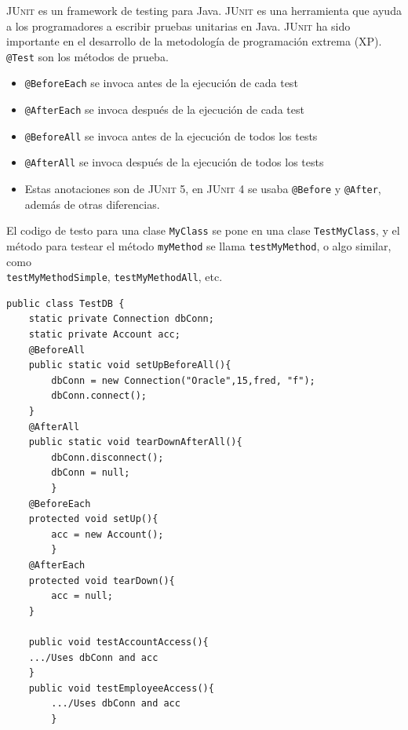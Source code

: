 \begin{paracol}{2}
	
	\colfill
	\textsc{JUnit} es un framework de testing para Java. \textsc{JUnit} es una herramienta que ayuda a los programadores a escribir pruebas unitarias en Java. \textsc{JUnit} ha sido importante en el desarrollo de la metodología de programación extrema (XP).
	\lstinline|@Test| son los métodos de prueba.
	\begin{itemize}
		\item \lstinline|@BeforeEach| se invoca antes de la ejecución de cada test
		\item \lstinline|@AfterEach| se invoca después de la ejecución de cada test
		\item \lstinline|@BeforeAll| se invoca antes de la ejecución de todos los tests
		\item \lstinline|@AfterAll| se invoca después de la ejecución de todos los tests
		\item[] Estas anotaciones son de \textsc{JUnit 5}, en \textsc{JUnit 4} se usaba \lstinline|@Before| y \lstinline|@After|, además de otras diferencias.
	\end{itemize}
	
	El codigo de testo para una clase \lstinline|MyClass| se pone en una clase \lstinline|TestMyClass|, y el método para testear el método \lstinline|myMethod| se llama \lstinline|testMyMethod|, o algo similar, como \\
	\lstinline|testMyMethodSimple|, \lstinline|testMyMethodAll|, etc.
	\colfill
	\switchcolumn

	\begin{lstlisting}
public class TestDB {
	static private Connection dbConn;
	static private Account acc;
	@BeforeAll
	public static void setUpBeforeAll(){
		dbConn = new Connection("Oracle",15,fred, "f");
		dbConn.connect();
	}
	@AfterAll
	public static void tearDownAfterAll(){
		dbConn.disconnect();
		dbConn = null;
		}
	@BeforeEach
	protected void setUp(){
		acc = new Account();
		}
	@AfterEach
	protected void tearDown(){
		acc = null;
	}
	
	public void testAccountAccess(){
	.../Uses dbConn and acc
	}
	public void testEmployeeAccess(){
		.../Uses dbConn and acc
		}
\end{lstlisting}			
\end{paracol}

